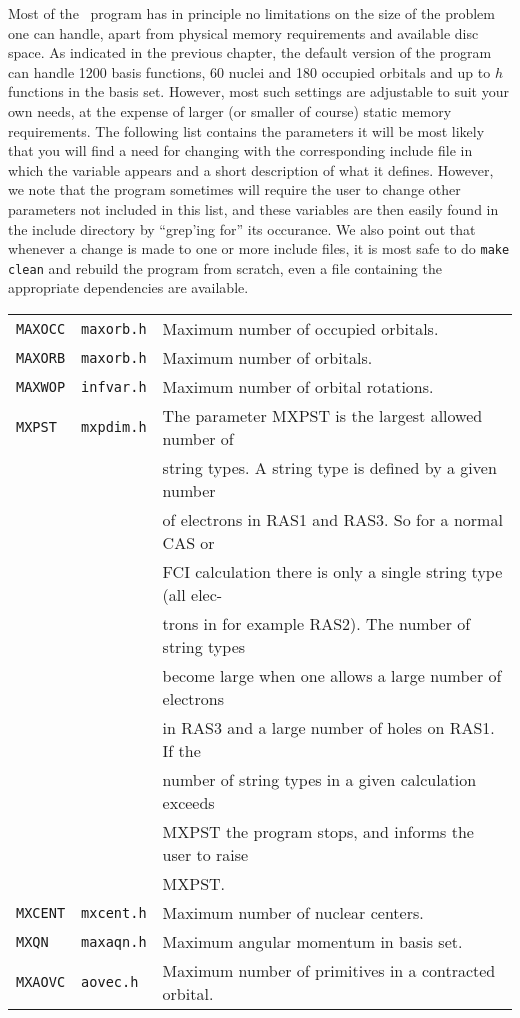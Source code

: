 Most of the \siraba\ program has in principle no limitations on
the size of the problem one can handle, apart from
physical memory requirements and available disc space. As
indicated in the previous chapter, the default version of the
program can handle 1200 basis functions, 60 nuclei and 180
occupied orbitals and up to $h$ functions in the basis set. However, most
such settings are adjustable to suit your own needs, at the expense
of larger (or smaller of course) static memory requirements. The
following list contains the parameters it will be most likely that
you will find a need for changing with the corresponding include
file in which the variable appears and a short description of what
it defines. However, we note that the program sometimes will
require the user to change other parameters not included in this
list, and these variables are then easily found in the include
directory by ``grep'ing for'' its occurance. We also point out that
whenever a change is made to one or more include files, it is most
safe to do \verb|make clean| and rebuild the program from scratch,
even a file containing the appropriate dependencies are available.

\bigskip

\begin{tabular}{lll}
\verb|MAXOCC| & \verb|maxorb.h| & Maximum number of occupied
orbitals.\index{occupied orbitals}\index{limits}\\
\verb|MAXORB| & \verb|maxorb.h| & Maximum number of orbitals.\index{orbitals}\index{limits}\\
\verb|MAXWOP| & \verb|infvar.h| & Maximum number of orbital
rotations.\index{orbital rotations}\index{limits}\\
\verb|MXPST| & \verb|mxpdim.h| & The parameter MXPST is the largest
allowed number\index{string numbers}\index{limits} of \\ && string types.
A string type is defined by a given number \\&& of electrons in RAS1 and
RAS3. So for a normal CAS or \\ &&  FCI calculation there is only a
single string
type (all elec-\\&&trons in for example RAS2). The number of string types
 \\ & & become large when one allows a large number of electrons
 \\ &&  in  RAS3  and a large number of holes on RAS1. If the
\\ && number of  string types
in a given calculation exceeds  \\&&  MXPST the program stops, and
informs the user to raise\\&& MXPST.\\
\verb|MXCENT| & \verb|mxcent.h| & Maximum number of nuclear
centers.\index{atomic centers}\index{limits}\\
\verb|MXQN| & \verb|maxaqn.h| & Maximum angular momentum in basis
set.\index{angular momentum}\index{limits}\\
\verb|MXAOVC| & \verb|aovec.h| & Maximum number of primitives in a
contracted orbital.\index{primitive orbitals}\index{limits}
\end{tabular}

